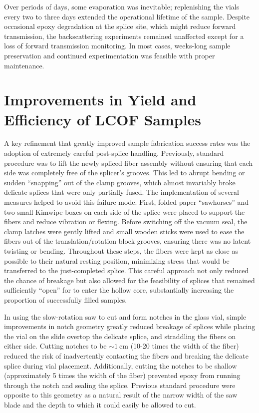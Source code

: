 Over periods of days, some evaporation was inevitable; replenishing the vials every two to three days extended the operational lifetime of the sample. Despite occasional epoxy degradation at the splice site, which might reduce forward transmission, the backscattering experiments remained unaffected except for a loss of forward transmission monitoring. In most cases, weeks-long sample preservation and continued experimentation was feasible with proper maintenance.

\section{Improvements in Yield and Efficiency of \acs{LCOF} Samples}
\label{Cooling:Appendix:sec:ImprovementsinYieldandEfficiencyofLCOFSamples}

A key refinement that greatly improved sample fabrication success rates was the adoption of extremely careful post-splice handling. Previously, standard procedure was to lift the newly spliced fiber assembly without ensuring that each side was completely free of the splicer’s grooves. This led to abrupt bending or sudden “snapping” out of the clamp grooves, which almost invariably broke delicate splices that were only partially fused. The implementation of several measures helped to avoid this failure mode. First, folded-paper “sawhorses” and two small Kimwipe boxes on each side of the splice were placed to support the fibers and reduce vibration or flexing. Before switching off the vacuum seal, the clamp latches were gently lifted and small wooden sticks were used to ease the fibers out of the translation/rotation block grooves, ensuring there was no latent twisting or bending. Throughout these steps, the fibers were kept as close as possible to their natural resting position, minimizing stress that would be transferred to the just-completed splice. This careful approach not only reduced the chance of breakage but also allowed for the feasibility of splices that remained sufficiently “open” for  to enter the hollow core, substantially increasing the proportion of successfully filled samples.

In using the slow-rotation saw to cut and form notches in the glass vial, simple improvements in notch geometry greatly reduced breakage of splices while placing the vial on the slide overtop the delicate splice, and straddling the fibers on either side. Cutting notches to be \(\sim\SI{1}{\centi\meter}\) (10-20 times the width of the fiber) reduced the risk of inadvertently contacting the fibers and breaking the delicate splice during vial placement. Additionally, cutting the notches to be shallow (approximately 5 times the width of the fiber) prevented epoxy from running through the notch and sealing the splice. Previous standard procedure were opposite to this geometry as a natural result of the narrow width of the saw blade and the depth to which it could easily be allowed to cut.

